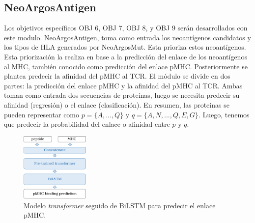 \documentclass[a4paper,11pt]{article}
\begin{document}
\subsection{NeoArgosAntigen}

Los objetivos específicos OBJ 6, OBJ  7, OBJ 8, y OBJ 9 serán desarrollados con este modulo. NeoArgosAntigen, toma como entrada los neoantígenos candidatos y los tipos de HLA generados por NeoArgosMut. Esta prioriza estos neoantígenos. Esta priorización la realiza en base a la predicción del enlace de los neoantígenos al MHC, también conocido como predicción del enlace pMHC. Posteriormente se plantea predecir la afinidad del pMHC al TCR. El módulo se divide en dos partes: la predicción del enlace pMHC y la afinidad del pMHC al TCR. Ambas toman como entrada dos secuencias de proteínas, luego se necesita predecir su afinidad (regresión) o el enlace (clasificación). En resumen, las proteínas se pueden representar como $p = \{ A, ... , Q \}$ y $q = \{ A, N, ... ,Q, E, G \}$. Luego, tenemos que  predecir la probabilidad del enlace o afinidad entre $p$ y $q$. 


\begin{figure}[H]
	\centering
	\includegraphics[width=0.30\textwidth]{../img/pipeline/proposal_pmhc}
	\caption{Modelo  \textit{transformer} seguido de BiLSTM para predecir el enlace pMHC.}
	\label{fig:proposal}
\end{figure}
\end{document}
